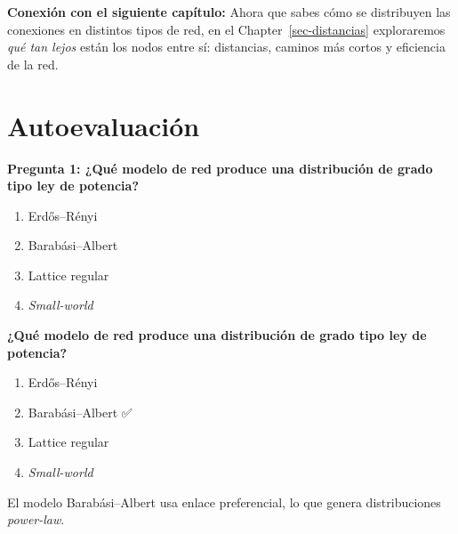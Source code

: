 \documentclass[
  letterpaper,
  DIV=11,
  numbers=noendperiod]{scrreprt}
\providecommand{\tightlist}{%
  \setlength{\itemsep}{0pt}\setlength{\parskip}{0pt}}
\begin{document}
\textbf{Conexión con el siguiente capítulo:} Ahora que sabes cómo se
distribuyen las conexiones en distintos tipos de red, en el
Chapter~\ref{sec-distancias} exploraremos \emph{qué tan lejos} están los
nodos entre sí: distancias, caminos más cortos y eficiencia de la red.

\section*{Autoevaluación}\label{autoevaluaciuxf3n-1}


\textbf{Pregunta 1: ¿Qué modelo de red produce una distribución de grado
tipo ley de potencia?}

\begin{enumerate}
\def\labelenumi{\alph{enumi})}
\tightlist
\item
  Erdős--Rényi
\item
  Barabási--Albert
\item
  Lattice regular
\item
  \emph{Small-world}
\end{enumerate}

\begin{tcolorbox}[enhanced jigsaw, toprule=.15mm, colframe=quarto-callout-caution-color-frame, coltitle=black, titlerule=0mm, colback=white, breakable, leftrule=.75mm, arc=.35mm, bottomtitle=1mm, toptitle=1mm, rightrule=.15mm, bottomrule=.15mm, left=2mm, title=\textcolor{quarto-callout-caution-color}{\faFire}\hspace{0.5em}{Respuesta 1}, colbacktitle=quarto-callout-caution-color!10!white, opacityback=0, opacitybacktitle=0.6]

\textbf{¿Qué modelo de red produce una distribución de grado tipo ley de
potencia?}

\begin{enumerate}
\def\labelenumi{\alph{enumi})}
\tightlist
\item
  Erdős--Rényi
\item
  Barabási--Albert ✅
\item
  Lattice regular
\item
  \emph{Small-world}
\end{enumerate}

El modelo Barabási--Albert usa enlace preferencial, lo que genera
distribuciones \emph{power-law}.

\end{tcolorbox}
\end{document}
